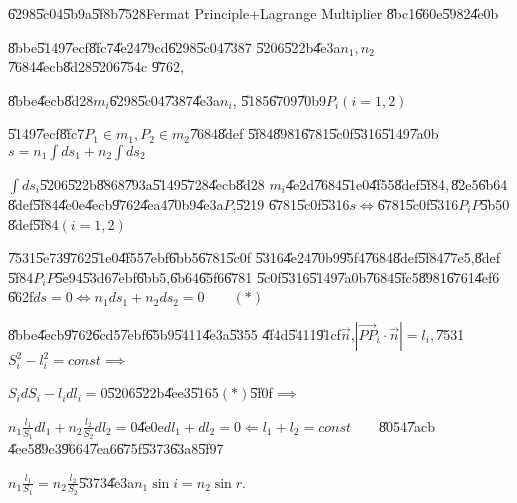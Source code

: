 \documentclass{article}
\begin{document}
\U{6298}\U{5c04}\U{5b9a}\U{5f8b}\U{7528}Fermat Principle+Lagrange Multiplier 
\U{8bc1}\U{660e}\U{5982}\U{4e0b}

\U{8bbe}\U{5149}\U{7ecf}\U{8fc7}\U{4e24}\U{79cd}\U{6298}\U{5c04}\U{7387}%
\U{5206}\U{522b}\U{4e3a}$n_{1},n_{2}$\U{7684}\U{4ecb}\U{8d28}\U{5206}\U{754c}%
\U{9762},

\U{8bbe}\U{4ecb}\U{8d28}$m_{i}$\U{6298}\U{5c04}\U{7387}\U{4e3a}$n_{i}$,%
\U{5185}\U{6709}\U{70b9}$P_{i}\left( i=1,2\right) $

\U{5149}\U{7ecf}\U{8fc7}$P_{1}\in m_{1},P_{2}\in m_{2}$\U{7684}\U{8def}%
\U{5f84}\U{8981}\U{6781}\U{5c0f}\U{5316}\U{5149}\U{7a0b}$s=n_{1}\int
ds_{1}+n_{2}\int ds_{2}$

$\int ds_{i}$\U{5206}\U{522b}\U{8868}\U{793a}\U{5149}\U{5728}\U{4ecb}\U{8d28}%
$m_{i}$\U{4e2d}\U{7684}\U{51e0}\U{4f55}\U{8def}\U{5f84}$,$\U{82e5}\U{6b64}%
\U{8def}\U{5f84}\U{4e0e}\U{4ecb}\U{9762}\U{4ea4}\U{70b9}\U{4e3a}$P$,\U{5219}%
\U{6781}\U{5c0f}\U{5316}$s\iff $\U{6781}\U{5c0f}\U{5316}$P_{i}P$\U{5b50}%
\U{8def}\U{5f84}$\left( i=1,2\right) $

\U{7531}\U{5e73}\U{9762}\U{51e0}\U{4f55}\U{7ebf}\U{6bb5}\U{6781}\U{5c0f}%
\U{5316}\U{4e24}\U{70b9}\U{95f4}\U{7684}\U{8def}\U{5f84}\U{77e5},\U{8def}%
\U{5f84}$P_{i}P$\U{5e94}\U{53d6}\U{7ebf}\U{6bb5},\U{6b64}\U{65f6}\U{6781}%
\U{5c0f}\U{5316}\U{5149}\U{7a0b}\U{7684}\U{5fc5}\U{8981}\U{6761}\U{4ef6}%
\U{662f}$ds=0\iff n_{1}ds_{1}+n_{2}ds_{2}=0\qquad \left( \ast \right) $

\U{8bbe}\U{4ecb}\U{9762}\U{6cd5}\U{7ebf}\U{65b9}\U{5411}\U{4e3a}\U{5355}%
\U{4f4d}\U{5411}\U{91cf}$\vec{n}$,$\left\vert \overrightarrow{PP}_{i}\cdot 
\vec{n}\right\vert =l_{i},$\U{7531}$S_{i}^{2}-l_{i}^{2}=const\implies $

$S_{i}dS_{i}-l_{i}dl_{i}=0$\U{5206}\U{522b}\U{4ee3}\U{5165}$\left( \ast
\right) $\U{5f0f}$\implies $

$n_{1}\frac{l_{1}}{S_{1}}dl_{1}+n_{2}\frac{l_{2}}{S_{2}}dl_{2}=0$\U{4e0e}$%
dl_{1}+dl_{2}=0\Longleftarrow l_{1}+l_{2}=const\qquad $\U{8054}\U{7acb}%
\U{4ee5}\U{89e3}\U{9664}\U{7ea6}\U{675f}\U{5373}\U{63a8}\U{5f97}

$n_{1}\frac{l_{1}}{S_{1}}=n_{2}\frac{l_{2}}{S_{2}}$\U{5373}\U{4e3a}$%
n_{1}\sin i=n_{2}\sin r.$
\end{document}
